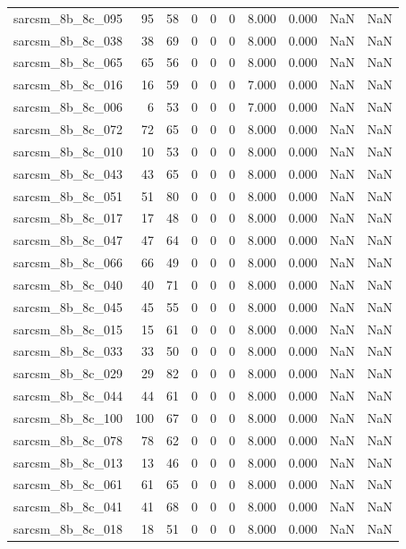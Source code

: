 \documentclass{article}
\begin{document}
\begin{longtable}{lrrrrrrrrr}
sarcsm\_8b\_8c\_095 & 95 & 58 & 0 & 0 & 0 & 8.000 & 0.000 & NaN & NaN \\
sarcsm\_8b\_8c\_038 & 38 & 69 & 0 & 0 & 0 & 8.000 & 0.000 & NaN & NaN \\
sarcsm\_8b\_8c\_065 & 65 & 56 & 0 & 0 & 0 & 8.000 & 0.000 & NaN & NaN \\
sarcsm\_8b\_8c\_016 & 16 & 59 & 0 & 0 & 0 & 7.000 & 0.000 & NaN & NaN \\
sarcsm\_8b\_8c\_006 & 6 & 53 & 0 & 0 & 0 & 7.000 & 0.000 & NaN & NaN \\
sarcsm\_8b\_8c\_072 & 72 & 65 & 0 & 0 & 0 & 8.000 & 0.000 & NaN & NaN \\
sarcsm\_8b\_8c\_010 & 10 & 53 & 0 & 0 & 0 & 8.000 & 0.000 & NaN & NaN \\
sarcsm\_8b\_8c\_043 & 43 & 65 & 0 & 0 & 0 & 8.000 & 0.000 & NaN & NaN \\
sarcsm\_8b\_8c\_051 & 51 & 80 & 0 & 0 & 0 & 8.000 & 0.000 & NaN & NaN \\
sarcsm\_8b\_8c\_017 & 17 & 48 & 0 & 0 & 0 & 8.000 & 0.000 & NaN & NaN \\
sarcsm\_8b\_8c\_047 & 47 & 64 & 0 & 0 & 0 & 8.000 & 0.000 & NaN & NaN \\
sarcsm\_8b\_8c\_066 & 66 & 49 & 0 & 0 & 0 & 8.000 & 0.000 & NaN & NaN \\
sarcsm\_8b\_8c\_040 & 40 & 71 & 0 & 0 & 0 & 8.000 & 0.000 & NaN & NaN \\
sarcsm\_8b\_8c\_045 & 45 & 55 & 0 & 0 & 0 & 8.000 & 0.000 & NaN & NaN \\
sarcsm\_8b\_8c\_015 & 15 & 61 & 0 & 0 & 0 & 8.000 & 0.000 & NaN & NaN \\
sarcsm\_8b\_8c\_033 & 33 & 50 & 0 & 0 & 0 & 8.000 & 0.000 & NaN & NaN \\
sarcsm\_8b\_8c\_029 & 29 & 82 & 0 & 0 & 0 & 8.000 & 0.000 & NaN & NaN \\
sarcsm\_8b\_8c\_044 & 44 & 61 & 0 & 0 & 0 & 8.000 & 0.000 & NaN & NaN \\
sarcsm\_8b\_8c\_100 & 100 & 67 & 0 & 0 & 0 & 8.000 & 0.000 & NaN & NaN \\
sarcsm\_8b\_8c\_078 & 78 & 62 & 0 & 0 & 0 & 8.000 & 0.000 & NaN & NaN \\
sarcsm\_8b\_8c\_013 & 13 & 46 & 0 & 0 & 0 & 8.000 & 0.000 & NaN & NaN \\
sarcsm\_8b\_8c\_061 & 61 & 65 & 0 & 0 & 0 & 8.000 & 0.000 & NaN & NaN \\
sarcsm\_8b\_8c\_041 & 41 & 68 & 0 & 0 & 0 & 8.000 & 0.000 & NaN & NaN \\
sarcsm\_8b\_8c\_018 & 18 & 51 & 0 & 0 & 0 & 8.000 & 0.000 & NaN & NaN \\

\end{longtable}
\end{document}
